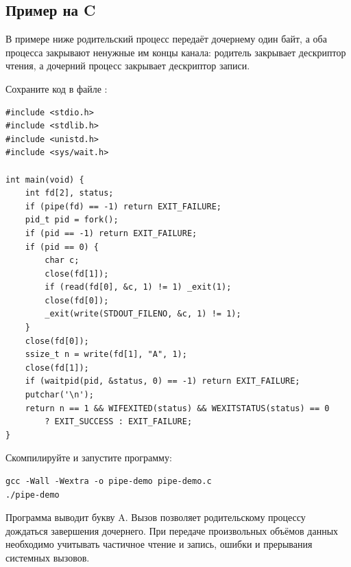 \subsection{Пример на C}

В примере ниже родительский процесс передаёт дочернему один байт, а оба процесса закрывают ненужные им концы канала: родитель закрывает дескриптор чтения, а дочерний процесс закрывает дескриптор записи.

\par\addvspace{10pt}\noindent\begin{minipage}{\linewidth}
\setlength{\parindent}{0pt}\noindent\hspace*{1.25cm}Сохраните код в файле :\par\kern 10pt
\begin{verbatim}
#include <stdio.h>
#include <stdlib.h>
#include <unistd.h>
#include <sys/wait.h>

int main(void) {
    int fd[2], status;
    if (pipe(fd) == -1) return EXIT_FAILURE;
    pid_t pid = fork();
    if (pid == -1) return EXIT_FAILURE;
    if (pid == 0) {
        char c;
        close(fd[1]);
        if (read(fd[0], &c, 1) != 1) _exit(1);
        close(fd[0]);
        _exit(write(STDOUT_FILENO, &c, 1) != 1);
    }
    close(fd[0]);
    ssize_t n = write(fd[1], "A", 1);
    close(fd[1]);
    if (waitpid(pid, &status, 0) == -1) return EXIT_FAILURE;
    putchar('\n');
    return n == 1 && WIFEXITED(status) && WEXITSTATUS(status) == 0
        ? EXIT_SUCCESS : EXIT_FAILURE;
}
\end{verbatim}
\end{minipage}\par\addvspace{10pt}

\par\addvspace{10pt}\noindent\begin{minipage}{\linewidth}
\setlength{\parindent}{0pt}\noindent\hspace*{1.25cm}Скомпилируйте и запустите программу:\par\kern 10pt
\begin{verbatim}
gcc -Wall -Wextra -o pipe-demo pipe-demo.c
./pipe-demo
\end{verbatim}
\end{minipage}\par\addvspace{10pt}

Программа выводит букву A. Вызов  позволяет родительскому процессу дождаться завершения дочернего. При передаче произвольных объёмов данных необходимо учитывать частичное чтение и запись, ошибки и прерывания системных вызовов.

